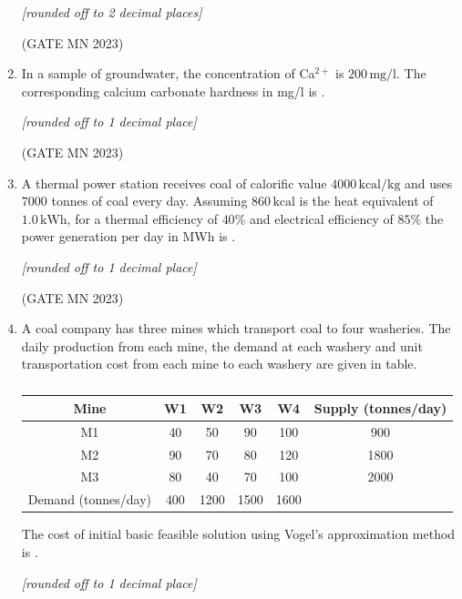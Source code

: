 \documentclass[journal]{IEEEtran}
\begin{document}
\begin{enumerate}
\textit{[rounded off to 2 decimal places]}  


\hfill(GATE MN 2023)
\item In a sample of groundwater, the concentration of Ca$^{2+}$ is $200 \,\text{mg/l}$.  
The corresponding calcium carbonate hardness in mg/l is \underline{\hspace{2cm}}.  

\textit{[rounded off to 1 decimal place]}  



\hfill(GATE MN 2023)
\item A thermal power station receives coal of calorific value $4000 \,\text{kcal/kg}$ and uses $7000$ tonnes of coal every day.  
Assuming $860 \,\text{kcal}$ is the heat equivalent of $1.0 \,\text{kWh}$, for a thermal efficiency of $40\%$ and electrical efficiency of $85\%$ the power generation per day in MWh is \underline{\hspace{2cm}}.  

\textit{[rounded off to 1 decimal place]}  



\hfill(GATE MN 2023)
\item A coal company has three mines which transport coal to four washeries.  
The daily production from each mine, the demand at each washery and unit transportation cost from each mine to each washery are given in table.  

\begin{table}[H]                                  
	\centering\normalsize
\begin{tabular}{|c|c|c|c|c|c|}
\hline
Mine & W1 & W2 & W3 & W4 & Supply (tonnes/day) \\
\hline
M1 & 40 & 50 & 90 & 100 & 900 \\\hline
M2 & 90 & 70 & 80 & 120 & 1800 \\\hline
M3 & 80 & 40 & 70 & 100 & 2000 \\
\hline
Demand (tonnes/day) & 400 & 1200 & 1500 & 1600 & \\
\hline
\end{tabular}
\caption{}                                   
\label{tab:Q57}                             
\end{table}

The cost of initial basic feasible solution using Vogel’s approximation method is \underline{\hspace{2cm}}.  

\textit{[rounded off to 1 decimal place]}  



\end{enumerate}
\end{document}
